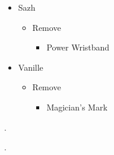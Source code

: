 \begin{multicols}{2}
	\begin{menu}
		\begin{itemize}
			\equip
			\begin{itemize}
				\item Sazh
				      \begin{itemize}
					      \item Remove
					            \begin{itemize}
						            \item Power Wristband
					            \end{itemize}
				      \end{itemize}
				\item Vanille
				      \begin{itemize}
					      \item Remove
					            \begin{itemize}
						            \item Magician's Mark
					            \end{itemize}
				      \end{itemize}
			\end{itemize}
		\end{itemize}
	\end{menu}


	.

	.
\end{multicols}
